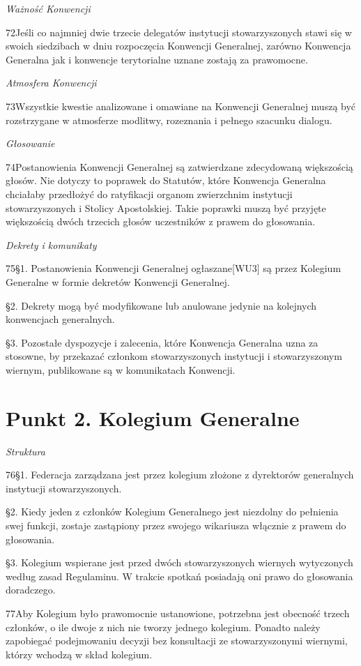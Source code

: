 ﻿\documentclass{book}
\newcommand{\lett}[1]{\lettrine[findent=6pt]{#1}}
\newcommand{\ssec}[1]{\vspace{1em}\textit{#1}\vspace{.5em}\nopagebreak}
\begin{document}
\ssec{Ważność Konwencji}


\lett{72} Jeśli co najmniej dwie trzecie delegatów instytucji stowarzyszonych stawi się w swoich siedzibach w dniu rozpoczęcia Konwencji Generalnej, zarówno Konwencja Generalna jak i konwencje terytorialne uznane zostają za prawomocne.
 
\ssec{Atmosfera Konwencji}


\lett{73} Wszystkie kwestie analizowane i omawiane na Konwencji Generalnej muszą być rozstrzygane w atmosferze modlitwy, rozeznania i pełnego szacunku dialogu.
 
\ssec{Głosowanie}


\lett{74} Postanowienia Konwencji Generalnej są zatwierdzane zdecydowaną większością głosów. Nie dotyczy to poprawek do Statutów, które Konwencja Generalna chciałaby przedłożyć do ratyfikacji organom zwierzchnim instytucji stowarzyszonych i Stolicy Apostolskiej. Takie poprawki muszą być przyjęte większością dwóch trzecich głosów uczestników z prawem do głosowania.
 
\ssec{Dekrety i komunikaty }


\lett{75} \S{}1. Postanowienia Konwencji Generalnej ogłaszane[WU3]  są przez Kolegium Generalne w formie dekretów Konwencji Generalnej.


\S{}2. Dekrety mogą być modyfikowane lub anulowane jedynie na kolejnych konwencjach generalnych.


\S{}3. Pozostałe dyspozycje i zalecenia, które Konwencja Generalna uzna za stosowne, by przekazać członkom stowarzyszonych instytucji i stowarzyszonym wiernym, publikowane są w komunikatach Konwencji.
 
\section{Punkt 2. Kolegium Generalne}
 
\ssec{Struktura}


\lett{76} \S{}1. Federacja zarządzana jest przez kolegium złożone z dyrektorów generalnych instytucji stowarzyszonych.


\S{}2. Kiedy jeden z członków Kolegium Generalnego jest niezdolny do pełnienia swej funkcji, zostaje zastąpiony przez swojego wikariusza włącznie z prawem do głosowania.


\S{}3. Kolegium wspierane jest przed dwóch stowarzyszonych wiernych wytyczonych według zasad Regulaminu. W trakcie spotkań posiadają oni prawo do głosowania doradczego.
 
\lett{77} Aby Kolegium było prawomocnie ustanowione, potrzebna jest obecność trzech członków, o ile dwoje z nich nie tworzy jednego kolegium. Ponadto należy zapobiegać podejmowaniu decyzji bez konsultacji ze stowarzyszonymi wiernymi, którzy wchodzą w skład kolegium.
 
\end{document}
